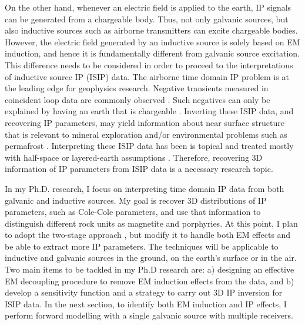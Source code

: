 \documentclass[letterpaper,11pt]{article}
\begin{document}
On the other hand, whenever an electric field is applied to the earth, IP signals can be generated from a chargeable body. Thus, not only galvanic sources, but also inductive sources such as airborne transmitters can excite chargeable bodies. However, the electric field generated by an inductive source is solely based on EM induction, and hence it is fundamentally different from galvanic source excitation. This difference needs to be considered in order to proceed to the interpretations of inductive source IP (ISIP) data. The airborne time domain IP problem is at the leading edge for geophysics research. Negative transients measured in coincident loop data are commonly observed \cite[]{SmithandKlein,JansenEtAl2004,Kang2015b}. Such negatives can only be explained by having an earth that is chargeable \cite[]{Weidelt1982}. Inverting these ISIP data, and recovering IP parameters, may yield information about near surface structure that is relevant to mineral exploration and/or environmental problems such as permafrost \cite[]{Kang2015b,SmithandKlein}. Interpreting these ISIP data has been is topical and treated mostly with half-space or layered-earth assumptions \cite[]{Kratzer2012}. Therefore, recovering 3D information of IP parameters from ISIP data is a necessary research topic. 

In my Ph.D. research, I focus on interpreting time domain IP data from both galvanic and inductive sources. My goal is recover  3D distributions of IP parameters, such as Cole-Cole parameters, and use that information to  distinguish different rock units  as magnetite and porphyries. 
At this point, I plan to  adopt the two-stage approach \cite[]{doug1994}, but modify it to handle both EM effects and be able to extract more IP parameters. The techniques will be applicable to inductive and galvanic sources in the ground, on the earth’s surface or in the air.  Two main items to be tackled in my Ph.D research are:  a) designing an effective EM decoupling procedure to remove EM induction effects from the data, and b) develop a sensitivity function and a strategy to carry out   3D IP inversion for ISIP data. In the next section, to identify both EM induction and IP effects, I perform forward modelling with a single galvanic source with multiple receivers. 
\clearpage
\end{document}
